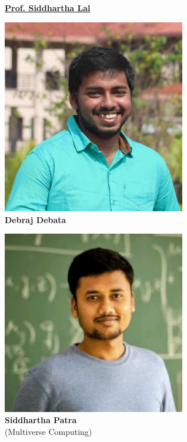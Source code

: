 \documentclass[10pt,aspectratio=169]{beamer}
\begin{document}
\begin{frame}{}
\begin{minipage}{0.25\textwidth}
	\footnotesize{{\bf \underline{Prof. Siddhartha Lal}}\\
	}
\end{minipage}
\begin{minipage}{0.25\textwidth}
	\centering
	\includegraphics[width=0.6\textwidth]{debraj.png}\\
	\footnotesize{{\bf Debraj Debata}\\
	}
\end{minipage}
\begin{minipage}{0.25\textwidth}
	\centering
	\includegraphics[width=0.6\textwidth]{spatra.jpeg}\\
	\footnotesize{{\bf Siddhartha Patra}\\
	(Multiverse Computing)}
\end{minipage}
\begin{minipage}{0.1\textwidth}

\end{minipage}
\end{frame}
\end{document}
